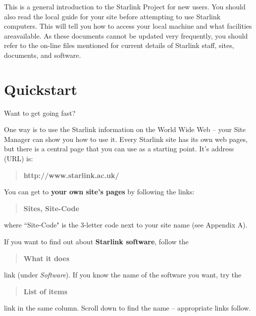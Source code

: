 \documentclass[twoside]{article}
\newcommand{\stardocabstract}{
This is a general introduction to the Starlink Project for new users.
You should also read the local guide for your site before attempting
to use Starlink computers.  This will tell you how to access your local
machine and what facilities areavailable.  As these documents cannot be
updated very frequently, you should refer to the on-line files
mentioned for current details of Starlink staff, sites, documents, and
software.
}
\newcommand{\htmladdnormallink}[2]{#1}
\newenvironment{latexonly}{}{}
\newcommand{\htmlref}[2]{#1}
\newcommand{\latexonlytoc}[0]{\tableofcontents}
\renewcommand{\thepage}{\roman{page}}
\begin{document}
\stardocabstract
\newpage
\begin{latexonly}
   \setlength{\parskip}{0mm}
   \latexonlytoc
   \setlength{\parskip}{\medskipamount}
\end{latexonly}
\newpage
\renewcommand{\thepage}{\arabic{page}}
\setcounter{page}{1}

\section{Quickstart}

Want to get going fast?

One way is to use the Starlink information on the World Wide Web -- your
Site Manager can show you how to use it.
Every Starlink site has its own web pages, but there is a central page that
you can use as a starting point.
It's address (URL) is:
\begin{quote}
\htmladdnormallink{\bf http://www.starlink.ac.uk/}{http://www.starlink.ac.uk/}
\end{quote}
You can get to {\bf your own site's pages} by following the links:
\begin{quote}
\htmladdnormallink{\bf Sites}{http://www.starlink.ac.uk/sites.html},
{\bf Site-Code}
\end{quote}
where ``Site-Code" is the 3-letter code next to your site name
(see \htmlref{Appendix A}{AppendixA}).

If you want to find out about {\bf Starlink software}, follow the
\begin{quote}
\htmladdnormallink{\bf What it does}
{http://www.starlink.ac.uk/star/docs/sun1.htx/sun1.html}
\end{quote}
link (under {\em Software}).
If you know the name of the software you want, try the
\begin{quote}
\htmladdnormallink{\bf List of items}
{http://www.starlink.ac.uk/softalpha.html}
\end{quote}
link in the same column.
Scroll down to find the name -- appropriate links follow.
\end{document}
